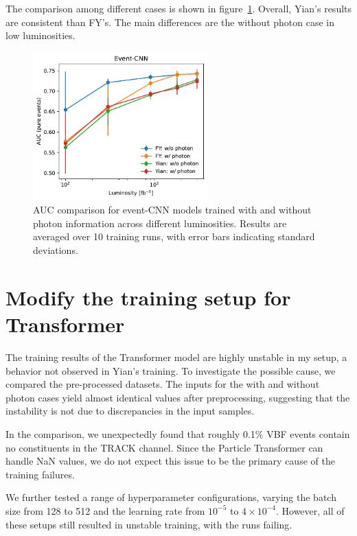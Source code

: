 \documentclass[12pt]{article}
\begin{document}
    The comparison among different cases is shown in figure~\ref{fig:eventCNN_AUC_various_L_yian0905_FY}. Overall, Yian's results are consistent than FY's. The main differences are the without photon case in low luminosities.  
    \begin{figure}[htpb]
        \centering
        \includegraphics[width=0.60\textwidth]{event_CNN_AUC-true_L_yian_FY.pdf}
        \caption{AUC comparison for event-CNN models trained with and without photon information across different luminosities. Results are averaged over 10 training runs, with error bars indicating standard deviations.}
        \label{fig:eventCNN_AUC_various_L_yian0905_FY}
    \end{figure}

\section{Modify the training setup for Transformer}%
\label{sec:modify_the_training_setup_for_transformer}
    The training results of the Transformer model are highly unstable in my setup, a behavior not observed in Yian’s training. To investigate the possible cause, we compared the pre-processed datasets. The inputs for the with and without photon cases yield almost identical values after preprocessing, suggesting that the instability is not due to discrepancies in the input samples.

    In the comparison, we unexpectedly found that roughly 0.1\% VBF events contain no constituents in the TRACK channel. Since the Particle Transformer can handle NaN values, we do not expect this issue to be the primary cause of the training failures.

    We further tested a range of hyperparameter configurations, varying the batch size from 128 to 512 and the learning rate from $10^{-5}$ to $4\times10^{-4}$. However, all of these setups still resulted in unstable training, with the runs failing.
\end{document}
